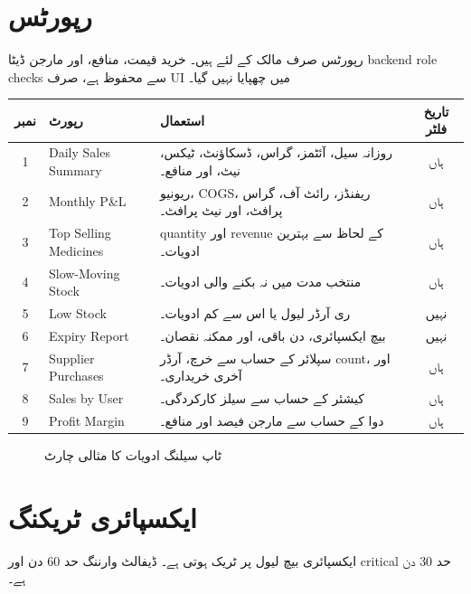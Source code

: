 \documentclass[12pt,a4paper]{article}
\begin{document}
\section{رپورٹس}
رپورٹس صرف مالک کے لئے ہیں۔ خرید قیمت، منافع، اور مارجن ڈیٹا backend role checks سے محفوظ ہے، صرف UI میں چھپایا نہیں گیا۔

\begin{longtable}{clp{7cm}c}
\toprule
\textbf{نمبر} & \textbf{رپورٹ} & \textbf{استعمال} & \textbf{تاریخ فلٹر} \\
\midrule
1 & Daily Sales Summary & روزانہ سیل، آئٹمز، گراس، ڈسکاؤنٹ، ٹیکس، نیٹ، اور منافع۔ & ہاں \\
2 & Monthly P\&L & ریونیو، COGS، ریفنڈز، رائٹ آف، گراس پرافٹ، اور نیٹ پرافٹ۔ & ہاں \\
3 & Top Selling Medicines & quantity اور revenue کے لحاظ سے بہترین ادویات۔ & ہاں \\
4 & Slow-Moving Stock & منتخب مدت میں نہ بکنے والی ادویات۔ & ہاں \\
5 & Low Stock & ری آرڈر لیول یا اس سے کم ادویات۔ & نہیں \\
6 & Expiry Report & بیچ ایکسپائری، دن باقی، اور ممکنہ نقصان۔ & نہیں \\
7 & Supplier Purchases & سپلائر کے حساب سے خرچ، آرڈر count، اور آخری خریداری۔ & ہاں \\
8 & Sales by User & کیشئر کے حساب سے سیلز کارکردگی۔ & ہاں \\
9 & Profit Margin & دوا کے حساب سے مارجن فیصد اور منافع۔ & ہاں \\
\bottomrule
\end{longtable}

\begin{figure}[H]
\centering
{}
\caption{ٹاپ سیلنگ ادویات کا مثالی چارٹ}
\end{figure}

\section{ایکسپائری ٹریکنگ}
ایکسپائری بیچ لیول پر ٹریک ہوتی ہے۔ ڈیفالٹ وارننگ حد 60 دن اور critical حد 30 دن ہے۔
\end{document}
